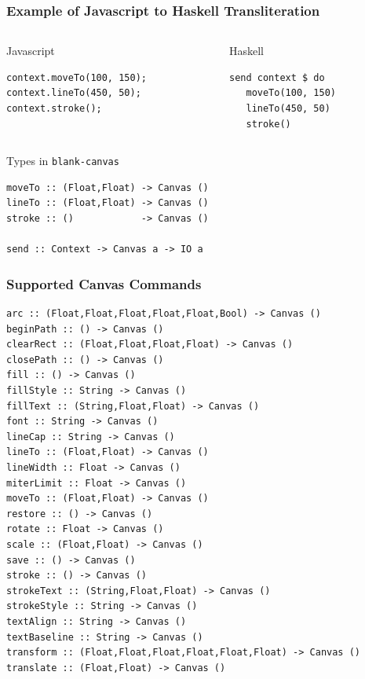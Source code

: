 \documentclass{beamer}
\begin{document}
\begin{frame}[fragile]
\frametitle{Example of Javascript to Haskell Transliteration}

\begin{columns}
\begin{column}{0.50\textwidth}
\begin{codeblock*}[0.85]{Javascript}
\begin{verbatim}
context.moveTo(100, 150);
context.lineTo(450, 50);
context.stroke();
\end{verbatim}
\end{codeblock*}
\end{column}

\pause{}
\begin{column}{0.50\textwidth}
\begin{codeblock*}[0.65]{Haskell}
\begin{verbatim}
send context $ do
   moveTo(100, 150)
   lineTo(450, 50)
   stroke()
\end{verbatim}
\end{codeblock*}
\end{column}

\end{columns}

\frameskip
\frameskip
\frameskip

\pause{}

\centering
\begin{codeblock*}[0.6]{Types in {\tt blank-canvas}}
\begin{verbatim}
moveTo :: (Float,Float) -> Canvas ()
lineTo :: (Float,Float) -> Canvas ()
stroke :: ()            -> Canvas ()

send :: Context -> Canvas a -> IO a
\end{verbatim}
\end{codeblock*}

\end{frame}        
        
\begin{frame}[fragile]
\frametitle{Supported Canvas Commands}

\begin{codeblock}[0.6]
\tiny
\begin{verbatim}
arc :: (Float,Float,Float,Float,Float,Bool) -> Canvas ()
beginPath :: () -> Canvas ()
clearRect :: (Float,Float,Float,Float) -> Canvas ()
closePath :: () -> Canvas ()
fill :: () -> Canvas ()
fillStyle :: String -> Canvas ()
fillText :: (String,Float,Float) -> Canvas ()
font :: String -> Canvas ()
lineCap :: String -> Canvas ()
lineTo :: (Float,Float) -> Canvas ()
lineWidth :: Float -> Canvas ()
miterLimit :: Float -> Canvas ()
moveTo :: (Float,Float) -> Canvas ()
restore :: () -> Canvas ()
rotate :: Float -> Canvas ()
scale :: (Float,Float) -> Canvas ()
save :: () -> Canvas ()
stroke :: () -> Canvas ()
strokeText :: (String,Float,Float) -> Canvas ()
strokeStyle :: String -> Canvas ()
textAlign :: String -> Canvas ()
textBaseline :: String -> Canvas ()
transform :: (Float,Float,Float,Float,Float,Float) -> Canvas ()
translate :: (Float,Float) -> Canvas ()        
\end{verbatim}        
\end{codeblock}
\end{frame}
\end{document}
